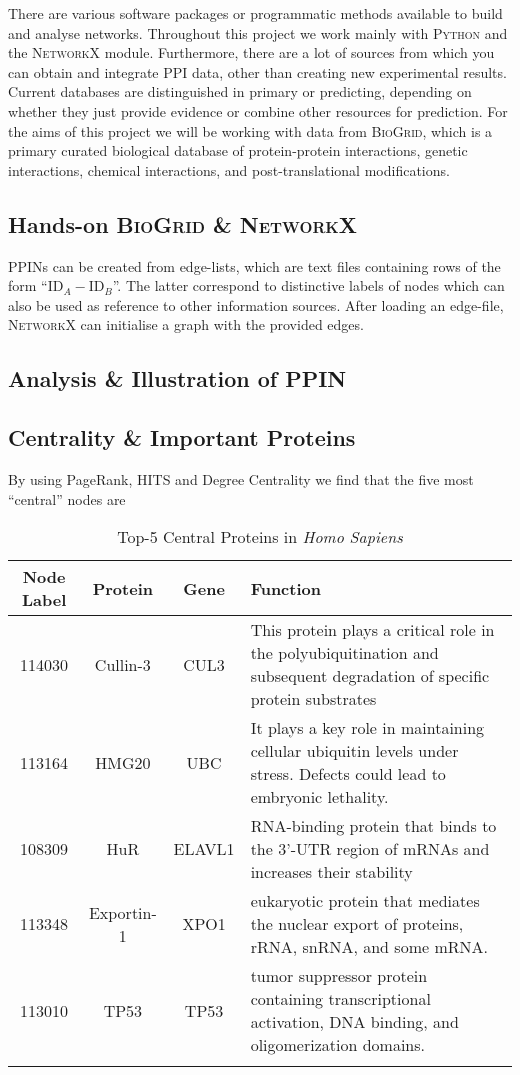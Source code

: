 \label{sec:2-task1}
There are various software packages or programmatic methods available to build and analyse networks. Throughout this project we work mainly with \textsc{Python} and the \textsc{NetworkX} module. Furthermore, there are a lot of sources from which you can obtain and integrate PPI data, other than creating new experimental results. Current databases are distinguished in primary or predicting, depending on whether they just provide evidence or combine other resources for prediction. For the aims of this project we will be working with data from \textsc{BioGrid}, which is a primary curated biological database of protein-protein interactions, genetic interactions, chemical interactions, and post-translational modifications.

\subsection{Hands-on \textsc{BioGrid} \& \textsc{NetworkX}}

PPINs can be created from edge-lists, which are text files containing rows of the form ``$\text{ID}_A - \text{ID}_B$''. The latter correspond to distinctive labels of nodes which can also be used as reference  to other information sources. After loading an edge-file, \textsc{NetworkX} can initialise a graph with the provided edges.
\subsection{Analysis \& Illustration of PPIN}

\subsection{Centrality \& Important Proteins}
By using PageRank, HITS and Degree Centrality we find that the five most ``central'' nodes are

\begin{table}[h]%
	\centering
	\caption{Top-5 Central Proteins in \textit{Homo Sapiens}}
	\begin{tabular}{cccl}
		Node Label & Protein & Gene & Function \\
		\midrule
		114030 & Cullin-3 & CUL3 & This protein plays a critical role in the polyubiquitination and subsequent degradation of specific protein substrates \\
		113164 & HMG20 &  UBC & It plays a key role in maintaining cellular ubiquitin levels under stress. Defects could lead to embryonic lethality. \\
		108309 & HuR & ELAVL1 & RNA-binding protein that binds to the 3'-UTR region of mRNAs and increases their stability \\
		113348 & Exportin-1 & XPO1 &  eukaryotic protein that mediates the nuclear export of proteins, rRNA, snRNA, and some mRNA. \\
		113010 & TP53 & TP53 & tumor suppressor protein containing transcriptional activation, DNA binding, and oligomerization domains.  \\
		\bottomrule
		\label{tab:central}
	\end{tabular}
\end{table}

